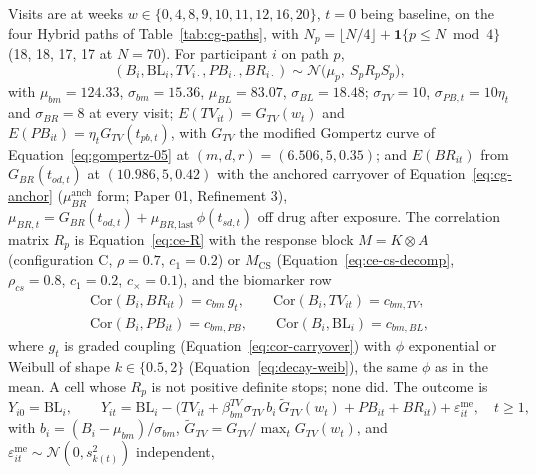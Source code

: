 \documentclass[11pt]{article}
\begin{document}
Visits are at weeks $w \in \{0, 4, 8, 9, 10, 11, 12, 16, 20\}$, $t = 0$
being baseline, on the four Hybrid paths of Table~\ref{tab:cg-paths},
with $N_p = \lfloor N/4 \rfloor + \mathbf 1\{p \le N \bmod 4\}$ (18, 18,
17, 17 at $N = 70$). For participant $i$ on path $p$,
\begin{equation}
(B_i, \mathrm{BL}_i, TV_{i\cdot}, PB_{i\cdot}, BR_{i\cdot})
  \sim \mathcal N\big(\mu_p,\ S_p R_p S_p\big),
\label{eq:invd-joint}
\end{equation}
with $\mu_{bm} = 124.33$, $\sigma_{bm} = 15.36$, $\mu_{BL} = 83.07$,
$\sigma_{BL} = 18.48$; $\sigma_{TV} = 10$, $\sigma_{PB,t} = 10\eta_t$
and $\sigma_{BR} = 8$ at every visit; $E(TV_{it}) = G_{TV}(w_t)$ and
$E(PB_{it}) = \eta_t G_{TV}(t_{pb,t})$, with $G_{TV}$ the modified
Gompertz curve of Equation~\eqref{eq:gompertz-05} at $(m,
d, r) = (6.506, 5, 0.35)$; and $E(BR_{it})$
from $G_{BR}(t_{od,t})$ at $(10.986, 5, 0.42)$ with the anchored
carryover of Equation~\eqref{eq:cg-anchor}
($\mu_{BR}^{\mathrm{anch}}$ form; Paper 01, Refinement 3),
$\mu_{BR,t} = G_{BR}(t_{od,t}) + \mu_{BR,\mathrm{last}}\,\phi(t_{sd,t})$
off drug after exposure. The correlation matrix $R_p$ is Equation~\eqref{eq:ce-R}
with the response block $M = K \otimes A$ (configuration C, $\rho =
0.7$, $c_1 = 0.2$) or $M_{\mathrm{CS}}$ (Equation~\eqref{eq:ce-cs-decomp},
$\rho_{cs} = 0.8$, $c_1 = 0.2$, $c_\times = 0.1$), and the biomarker row
\begin{equation}
\begin{gathered}
\mathrm{Cor}(B_i, BR_{it}) = c_{bm}\, g_t, \qquad
\mathrm{Cor}(B_i, TV_{it}) = c_{bm,TV}, \\
\mathrm{Cor}(B_i, PB_{it}) = c_{bm,PB}, \qquad
\mathrm{Cor}(B_i, \mathrm{BL}_i) = c_{bm,BL},
\end{gathered}
\label{eq:invd-bmrow}
\end{equation}
where $g_t$ is graded coupling (Equation~\eqref{eq:cor-carryover}) with
$\phi$ exponential or Weibull of shape $k \in \{0.5, 2\}$
(Equation~\eqref{eq:decay-weib}), the same $\phi$ as in the mean. A cell
whose $R_p$ is not positive definite stops; none did. The outcome is
\begin{equation}
Y_{i0} = \mathrm{BL}_i, \qquad
Y_{it} = \mathrm{BL}_i - \big(TV_{it} + \beta_{bm}^{TV}\sigma_{TV}\, b_i\,
  \tilde G_{TV}(w_t) + PB_{it} + BR_{it}\big) + \varepsilon^{\mathrm{me}}_{it},
\quad t \ge 1,
\label{eq:invd-outcome}
\end{equation}
with $b_i = (B_i - \mu_{bm})/\sigma_{bm}$,
$\tilde G_{TV} = G_{TV}/\max_t G_{TV}(w_t)$, and
$\varepsilon^{\mathrm{me}}_{it} \sim \mathcal N(0, s_{k(t)}^2)$ independent,
\end{document}
